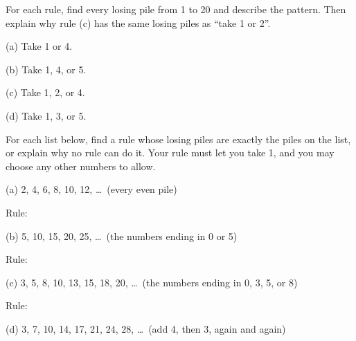 \documentclass[12pt]{article}
\begin{document}
\newpage
{}For each rule, find every losing pile from 1 to 20 and describe the pattern. Then explain why rule (c) has the same losing piles as “take 1 or 2”.

\vspace{0.4cm}
(a) Take 1 or 4.

\vspace{0.1cm}

\vspace{0.5cm}
(b) Take 1, 4, or 5.

\vspace{0.1cm}

\vspace{0.5cm}
(c) Take 1, 2, or 4.

\vspace{0.1cm}

\vspace{0.5cm}
(d) Take 1, 3, or 5.

\vspace{0.1cm}

\vspace{0.3cm}

\newpage
{}For each list below, find a rule whose losing piles are exactly the piles on the list, or explain why no rule can do it. Your rule must let you take 1, and you may choose any other numbers to allow.

\vspace{0.5cm}
(a) 2, 4, 6, 8, 10, 12, \ldots\ (every even pile)

\vspace{0.3cm}
Rule:

\vspace{0.6cm}
(b) 5, 10, 15, 20, 25, \ldots\ (the numbers ending in 0 or 5)

\vspace{0.3cm}
Rule:

\vspace{0.6cm}
(c) 3, 5, 8, 10, 13, 15, 18, 20, \ldots\ (the numbers ending in 0, 3, 5, or 8)

\vspace{0.3cm}
Rule:

\vspace{0.6cm}
(d) 3, 7, 10, 14, 17, 21, 24, 28, \ldots\ (add 4, then 3, again and again)
\end{document}
